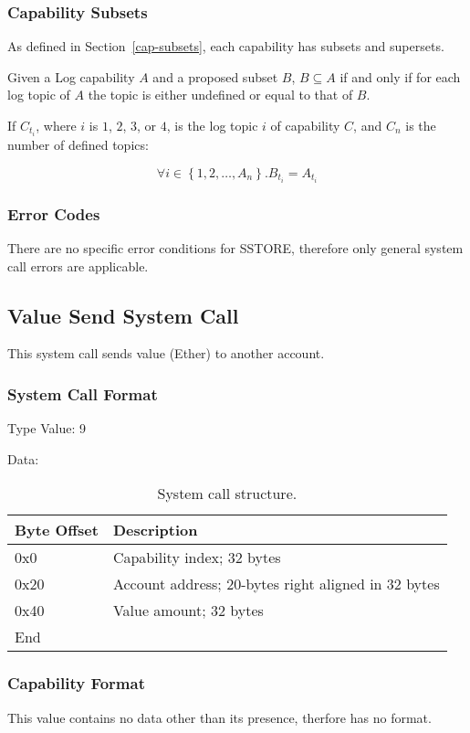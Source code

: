 \documentclass[english,a4paper]{article}
\let\oldparagraph\subsubsection
\renewcommand{\subsubsection}[1]{\oldparagraph{#1}\mbox{}}
\begin{document}
\subsubsection{Capability Subsets}
As defined in Section~\ref{cap-subsets}, each capability has subsets and
supersets.

Given a Log capability $A$ and a proposed subset $B$, $B \subseteq A$ if and
only if for each log topic of $A$ the topic is either undefined or equal to that
of $B$.

If $C_{t_i}$, where $i$ is $1$, $2$, $3$, or $4$, is the log topic $i$ of
capability $C$, and $C_n$ is the number of defined topics:

$$ \forall i \in \left\{1,2,\dots ,A_n\right\}. B_{t_i} = A_{t_i} $$

\subsubsection{Error Codes}
There are no specific error conditions for SSTORE, therefore only general system
call errors are applicable.

\subsection{Value Send System Call}
This system call sends value (Ether) to another account.

\subsubsection{System Call Format}
Type Value: 9

Data:

\begin{table}[H]
  \caption{System call structure.}
  \centering{}%
  \begin{tabular}{l|p{}}
    \hline
    Byte Offset & Description\tabularnewline
    \hline
    \hline
    0x0 & Capability index; 32 bytes \tabularnewline
    0x20 & Account address; 20-bytes right aligned in 32 bytes \tabularnewline
    0x40 & Value amount; 32 bytes \tabularnewline
    \hline
    End &  \tabularnewline
    \hline
  \end{tabular}
\end{table}

\subsubsection{Capability Format}
This value contains no data other than its presence, therfore has no format.
\end{document}
